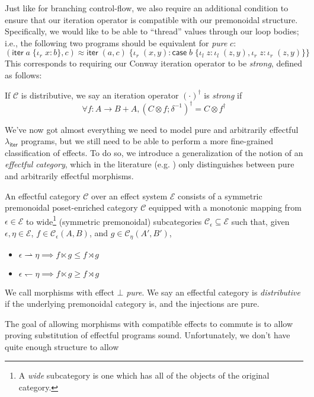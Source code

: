 \documentclass[acmsmall,screen,review]{acmart}
\newcommand{\mc}[1]{\ensuremath{\mathcal{#1}}}
\newcommand{\ms}[1]{\ensuremath{\mathsf{#1}}}
\newcommand{\lto}{:}
\newcommand{\linl}[1]{\iota_l\;{#1}}
\newcommand{\linr}[1]{\iota_r\;{#1}}
\newcommand{\caseexpr}[5]{\ms{case}\;#1\;\{\linl{#2} \lto #3, \linr{#4} \lto #5\}}
\newcommand{\liter}[3]{\ms{iter}\;#1\;\{ \linr{#2} \lto #3 \}}
\newcommand{\subiterexp}{\texorpdfstring{\(\lambda_{\ms{iter}}\)}{lambda-iter}}
\newcommand{\rightmove}{\rightharpoonup}
\newcommand{\leftmove}{\leftharpoondown}
\begin{document}
Just like for branching control-flow, we also require an additional condition to ensure that our
iteration operator is compatible with our premonoidal structure. Specifically, we would like to be
able to ``thread'' values through our loop bodies; i.e., the following two programs should be
equivalent for \emph{pure} $c$:
$$
(\liter{a}{x}{b}, c) \approx \liter{(a, c)}{(x, y)}
  {\caseexpr{b}{z}{\linl{(z, y)}}{z}{\linr{(z, y)}}}
$$
This corresponds to requiring our Conway iteration operator to be \emph{strong}, defined as follows:
\begin{definition}
  If $\mc{C}$ is distributive, we say an iteration operator $(\cdot)^\dagger$ is \emph{strong} if
  $$
  \forall f: A \to B + A, (C \otimes f ; \delta^{-1})^\dagger = C \otimes f^\dagger
  $$
\end{definition}
We've now got almost everything we need to model pure and arbitrarily effectful \subiterexp{}
programs, but we still need to be able to perform a more fine-grained classification of effects. To
do so, we introduce a generalization of the notion of an \emph{effectful category}, which in the
literature (e.g. \cite{promonad}) only distinguishes between pure and arbitrarily effectful
morphisms.
\begin{definition}
  An effectful category $\mc{C}$ over an effect system $\mc{E}$ consists of a symmetric premonoidal
  poset-enriched category $\mc{C}$ equipped with a  monotonic mapping from $\epsilon \in \mc{E}$ to
  wide\footnote{A \emph{wide} subcategory is one which has all of the objects of the original category.} (symmetric premonoidal) subcategories $\mc{C}_\epsilon \subseteq \mc{E}$ such that, given
  $\epsilon, \eta \in \mc{E}$, $f \in \mc{C}_\epsilon(A, B)$, and $g \in \mc{C}_\eta(A', B')$, 
  \begin{itemize}
    \item $\epsilon \rightmove \eta \implies f \ltimes g \leq f \rtimes g$
    \item $\epsilon \leftmove \eta \implies f \ltimes g \geq f \rtimes g$
  \end{itemize}
  We call morphisms with effect $\bot$ \emph{pure}. We say an effectful category is
  \emph{distributive} if the underlying premonoidal category is, and the injections are pure.
\end{definition}
The goal of allowing morphisms with compatible effects to commute is to allow proving substitution
of effectful programs sound. Unfortunately, we don't have quite enough structure to allow
\end{document}

